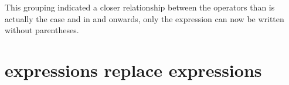 This grouping indicated a closer relationship between the operators
than is actually the case and in  and onwards, only the
expression  can now be written
without parentheses.

\iffalse
\section{Integer division rounds towards negative infinity}

\label{section:integer-division}

In \OldVersion, the operators \T{div} and \T{rem} compute $\mathit{div}_I^t$
and $\mathit{rem}_I^t$, respectively.  It is widely held to be more useful
if $\mathit{div}_I^f$ and $\mathit{rem}_I^f$ are easily accessible as
$\mathit{div}_I^f$ satisfies the relation
\[\mathit{div}_I^f(x+i*y,y) = \mathit{div}_I^f(x,y)+i\]
if $y\neq0$ and no overflow occurs.
\fi

\section{ expressions replace  expressions}

\label{section:new-try}

